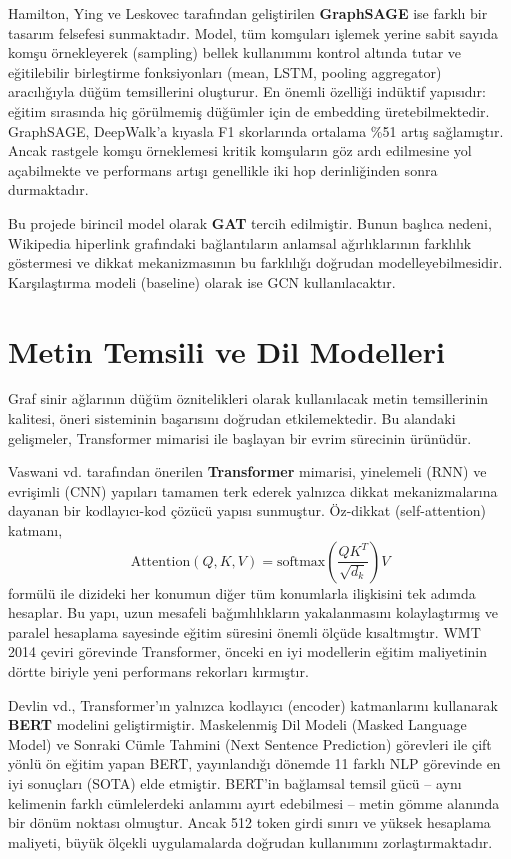 Hamilton, Ying ve Leskovec \cite{hamilton2017inductive} tarafından geliştirilen \textbf{GraphSAGE} ise farklı bir tasarım felsefesi sunmaktadır. Model, tüm komşuları işlemek yerine sabit sayıda komşu örnekleyerek (sampling) bellek kullanımını kontrol altında tutar ve eğitilebilir birleştirme fonksiyonları (mean, LSTM, pooling aggregator) aracılığıyla düğüm temsillerini oluşturur. En önemli özelliği indüktif yapısıdır: eğitim sırasında hiç görülmemiş düğümler için de embedding üretebilmektedir. GraphSAGE, DeepWalk'a kıyasla F1 skorlarında ortalama \%51 artış sağlamıştır. Ancak rastgele komşu örneklemesi kritik komşuların göz ardı edilmesine yol açabilmekte ve performans artışı genellikle iki hop derinliğinden sonra durmaktadır.

Bu projede birincil model olarak \textbf{GAT} tercih edilmiştir. Bunun başlıca nedeni, Wikipedia hiperlink grafındaki bağlantıların anlamsal ağırlıklarının farklılık göstermesi ve dikkat mekanizmasının bu farklılığı doğrudan modelleyebilmesidir. Karşılaştırma modeli (baseline) olarak ise GCN kullanılacaktır.

\section{Metin Temsili ve Dil Modelleri}

Graf sinir ağlarının düğüm öznitelikleri olarak kullanılacak metin temsillerinin kalitesi, öneri sisteminin başarısını doğrudan etkilemektedir. Bu alandaki gelişmeler, Transformer mimarisi ile başlayan bir evrim sürecinin ürünüdür.

Vaswani vd.\@ \cite{vaswani2017attention} tarafından önerilen \textbf{Transformer} mimarisi, yinelemeli (RNN) ve evrişimli (CNN) yapıları tamamen terk ederek yalnızca dikkat mekanizmalarına dayanan bir kodlayıcı-kod çözücü yapısı sunmuştur. Öz-dikkat (self-attention) katmanı,
\[
    \text{Attention}(Q, K, V) = \text{softmax}\!\left(\frac{QK^T}{\sqrt{d_k}}\right)V
\]
formülü ile dizideki her konumun diğer tüm konumlarla ilişkisini tek adımda hesaplar. Bu yapı, uzun mesafeli bağımlılıkların yakalanmasını kolaylaştırmış ve paralel hesaplama sayesinde eğitim süresini önemli ölçüde kısaltmıştır. WMT 2014 çeviri görevinde Transformer, önceki en iyi modellerin eğitim maliyetinin dörtte biriyle yeni performans rekorları kırmıştır.

Devlin vd.\@ \cite{devlin2019bert}, Transformer'ın yalnızca kodlayıcı (encoder) katmanlarını kullanarak \textbf{BERT} modelini geliştirmiştir. Maskelenmiş Dil Modeli (Masked Language Model) ve Sonraki Cümle Tahmini (Next Sentence Prediction) görevleri ile çift yönlü ön eğitim yapan BERT, yayınlandığı dönemde 11 farklı NLP görevinde en iyi sonuçları (SOTA) elde etmiştir. BERT'in bağlamsal temsil gücü -- aynı kelimenin farklı cümlelerdeki anlamını ayırt edebilmesi -- metin gömme alanında bir dönüm noktası olmuştur. Ancak 512 token girdi sınırı ve yüksek hesaplama maliyeti, büyük ölçekli uygulamalarda doğrudan kullanımını zorlaştırmaktadır.


